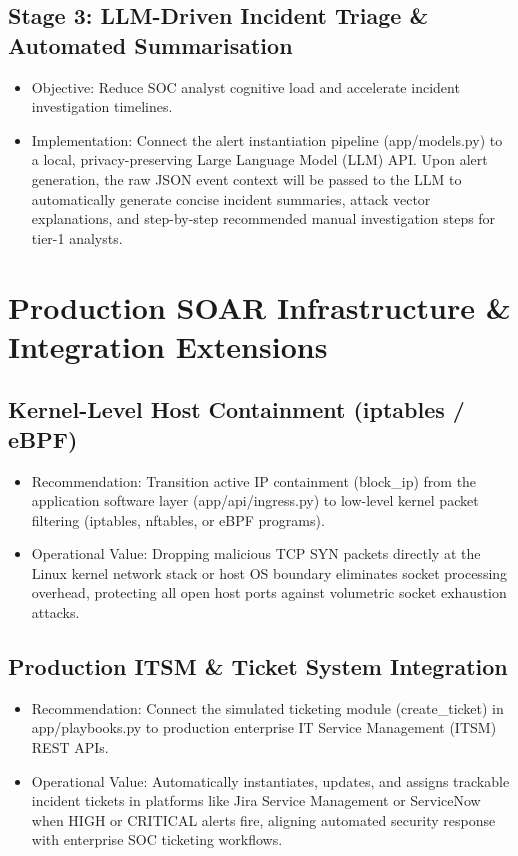 \subsection{Stage 3: LLM-Driven Incident Triage \& Automated Summarisation}

\begin{itemize}
  \item Objective: Reduce SOC analyst cognitive load and accelerate incident investigation timelines.
  \item Implementation: Connect the alert instantiation pipeline (app/models.py) to a local, privacy-preserving Large Language Model (LLM) API. Upon alert generation, the raw JSON event context will be passed to the LLM to automatically generate concise incident summaries, attack vector explanations, and step-by-step recommended manual investigation steps for tier-1 analysts.
\end{itemize}

\section{Production SOAR Infrastructure \& Integration Extensions}

\subsection{Kernel-Level Host Containment (iptables / eBPF)}

\begin{itemize}
  \item Recommendation: Transition active IP containment (block\_ip) from the application software layer (app/api/ingress.py) to low-level kernel packet filtering (iptables, nftables, or eBPF programs).
  \item Operational Value: Dropping malicious TCP SYN packets directly at the Linux kernel network stack or host OS boundary eliminates socket processing overhead, protecting all open host ports against volumetric socket exhaustion attacks.
\end{itemize}

\subsection{Production ITSM \& Ticket System Integration}

\begin{itemize}
  \item Recommendation: Connect the simulated ticketing module (create\_ticket) in app/playbooks.py to production enterprise IT Service Management (ITSM) REST APIs.
  \item Operational Value: Automatically instantiates, updates, and assigns trackable incident tickets in platforms like Jira Service Management or ServiceNow when HIGH or CRITICAL alerts fire, aligning automated security response with enterprise SOC ticketing workflows.
\end{itemize}

